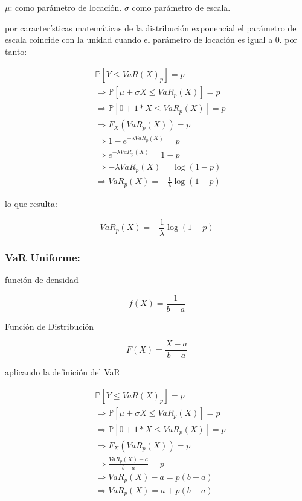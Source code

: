 \documentclass[]{article}
\begin{document}
\(\mu\): como parámetro de locación. \(\sigma\) como parámetro de
escala.

por características matemáticas de la distribución exponencial el
parámetro de escala coincide con la unidad cuando el parámetro de
locación es igual a 0. por tanto:

\[\begin{array}{rl}  
&\displaystyle \mathbb{P}[Y \leq VaR(X)_p]=p\\
&\displaystyle \Rightarrow \mathbb{P}[\mu + \sigma X \leq VaR_p(X)] = p\\
&\displaystyle \Rightarrow \mathbb{P}[0 + 1* X \leq VaR_p(X)] = p\\
&\displaystyle \Rightarrow F_X(VaR_{p}(X)) = p\\
&\displaystyle \Rightarrow 1- e^{-\lambda VaR_{p}(X)}=p\\
&\displaystyle \Rightarrow e^{-\lambda VaR_{p}(X)}= 1-p\\
&\displaystyle \Rightarrow -\lambda VaR_{p}(X)= \log(1-p)\\
&\displaystyle \Rightarrow VaR_{p}(X)= -\frac{1}{\lambda}\log(1-p)
\end{array}\]

lo que resulta:

\[VaR_{p}(X)= -\frac{1}{\lambda}\log(1-p)\]

\hypertarget{var-uniforme}{%
\subsubsection{\texorpdfstring{\textbf{VaR
Uniforme:}}{VaR Uniforme:}}\label{var-uniforme}}

función de densidad

\[f(X)= \frac{1}{b-a}\]

Función de Distribución

\[F(X)= \frac{X-a}{b-a}\]

aplicando la definición del VaR

\[\begin{array}{rl}  
&\displaystyle \mathbb{P}[Y \leq VaR(X)_p]=p\\
&\displaystyle \Rightarrow \mathbb{P}[\mu + \sigma X \leq VaR_p(X)] = p\\
&\displaystyle \Rightarrow \mathbb{P}[0 + 1* X \leq VaR_p(X)] = p\\
&\displaystyle \Rightarrow F_X(VaR_{p}(X)) = p\\
&\displaystyle \Rightarrow \frac{VaR_{p}(X)-a}{b-a}=p\\
&\displaystyle \Rightarrow VaR_{p}(X)-a=p(b-a)\\
&\displaystyle \Rightarrow VaR_{p}(X)=a+p(b-a)
\end{array}\]
\end{document}
